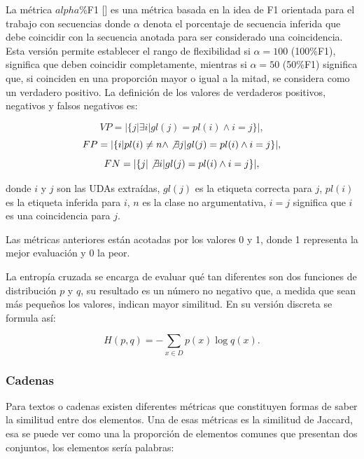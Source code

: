 La métrica $alpha$\%F1 [\cite{persing2016end}] es una métrica basada en la idea de F1 orientada para el 
trabajo con secuencias donde $\alpha$ denota el porcentaje de secuencia inferida que debe coincidir con 
la secuencia anotada para ser considerado una coincidencia. Esta versión permite
establecer el rango de flexibilidad si $\alpha=100$ (100\%F1), significa que deben coincidir completamente, 
mientras si $\alpha = 50$ (50\%F1) significa que, si coinciden en una proporción mayor o igual a la mitad, 
se considera como un verdadero positivo. La definición de los valores de verdaderos positivos, negativos 
y falsos negativos es:

\begin{equation}
	VP = |\{ j | \exists i | gl(j) = pl(i) \land i = j \}|,
\end{equation}
\begin{equation}
	FP = |\{ i | pl(i) \neq n \land \not\exists j | gl(j) = pl(i) \land i = j \}|,
\end{equation}
\begin{equation}
	FN = |\{ j | \not\exists i | gl(j) = pl(i) \land i = j \}|,
\end{equation}

donde $i$ y $j$ son las UDAs extraídas, $gl(j)$ es la etiqueta correcta para $j$, $pl(i)$ es 
la etiqueta inferida para $i$, $n$ es la clase no argumentativa, $i = j$ significa que $i$ es 
una coincidencia para $j$.

Las métricas anteriores están acotadas por los valores 0 y 1, donde 1 representa la mejor evaluación y 0 la 
peor.

La entropía cruzada se encarga de evaluar qué tan diferentes son dos funciones de distribución $p$ y $q$, su 
resultado es un número no negativo que, a medida que sean más pequeños los valores, indican mayor similitud. 
En su versión discreta se formula así:

\begin{equation}
	H(p, q) = - \sum_{x \in D} p(x) \log q(x).
\end{equation}

\subsubsection{Cadenas}

Para textos o cadenas existen diferentes métricas que constituyen formas de saber la similitud 
entre dos elementos. Una de esas métricas es la similitud de Jaccard, esa se puede ver como una 
la proporción de elementos comunes que presentan dos conjuntos, los elementos sería palabras:

